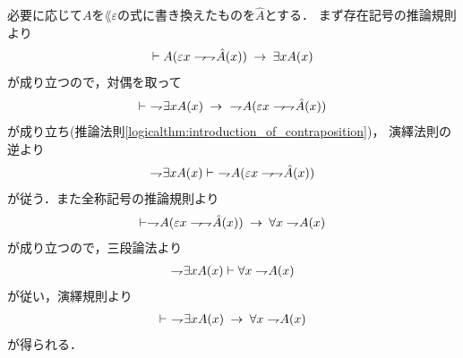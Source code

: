 	\begin{sketch}
		必要に応じて$A$を$\lang{\varepsilon}$の式に書き換えたものを$\hat{A}$とする．
		まず存在記号の推論規則より
		\begin{align}
			\vdash A(\varepsilon x \negation \negation \hat{A}(x))
			\rarrow \exists x A(x)
		\end{align}
		が成り立つので，対偶を取って
		\begin{align}
			\vdash\ \negation \exists x A(x) 
			\rarrow\ \negation A(\varepsilon x \negation \negation \hat{A}(x))
		\end{align}
		が成り立ち(推論法則\ref{logicalthm:introduction_of_contraposition})，
		演繹法則の逆より
		\begin{align}
			\negation \exists x A(x) \vdash\ \negation A(\varepsilon x \negation \negation \hat{A}(x))
		\end{align}
		が従う．また全称記号の推論規則より
		\begin{align}
			\vdash \negation A(\varepsilon x \negation \negation \hat{A}(x))
			\rarrow \forall x \negation A(x)
		\end{align}
		が成り立つので，三段論法より
		\begin{align}
			\negation \exists x A(x) \vdash \forall x \negation A(x)
		\end{align}
		が従い，演繹規則より
		\begin{align}
			\vdash\ \negation \exists x A(x) \rarrow \forall x \negation A(x)
		\end{align}
		が得られる．
		\QED
	\end{sketch}
